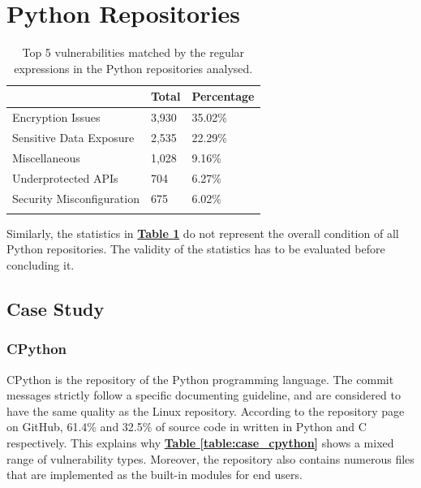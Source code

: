 \documentclass[12pt, a4paper]{report}
\begin{document}
\section{Python Repositories}
\begin{longtable}{|l|l|l|}
  \hline \endfirsthead \rowcolor[HTML]{D8D8D8}
  \multicolumn{1}{|c|}{Vulnerabilities} & \multicolumn{1}{|c|}{Total} &
  \multicolumn{1}{|c|}{Percentage} \\ \hline
  Encryption Issues & 3,930 & 35.02\% \\
  Sensitive Data Exposure & 2,535 & 22.29\% \\
  Miscellaneous & 1,028 & 9.16\% \\
  Underprotected APIs & 704 & 6.27\% \\
  Security Misconfiguration & 675 & 6.02\% \\ \hline
  \caption{Top 5 vulnerabilities matched by the regular expressions in the Python repositories
  analysed.}
  \label{table:top5_python}
\end{longtable}

Similarly, the statistics in \hyperref[table:top5_python]{\textbf{Table \ref*{table:top5_python}}}
do not represent the overall condition of all Python repositories. The validity of the statistics
has to be evaluated before concluding it.

\subsection{Case Study}
\subsubsection*{CPython}
CPython \cite{cpython_repo} is the repository of the Python programming language. The commit
messages strictly follow a specific documenting guideline, and are considered to have the same
quality as the Linux repository. According to the repository page on GitHub, 61.4\% and 32.5\% of
source code in written in Python and C respectively. This explains why
\hyperref[table:case_cpython]{\textbf{Table \ref*{table:case_cpython}}} shows a mixed range of
vulnerability types. Moreover, the repository also contains numerous files that are implemented as
the built-in modules for end users.
\end{document}
